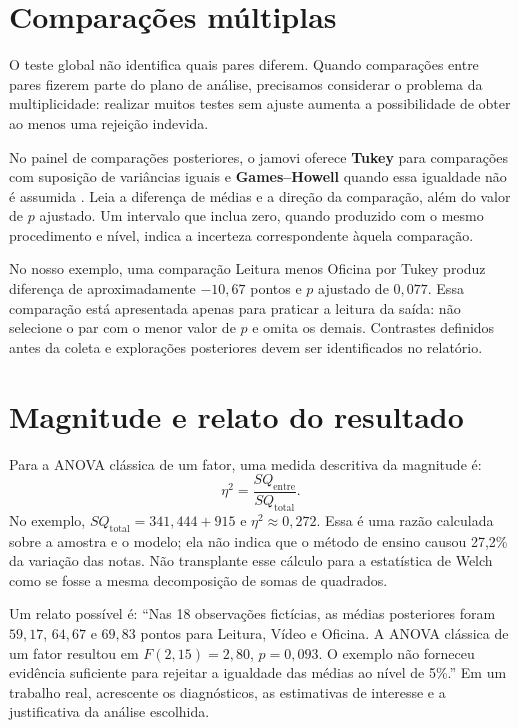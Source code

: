 \section{Comparações múltiplas}

O teste global não identifica quais pares diferem. Quando comparações entre pares fizerem parte do plano de análise, precisamos considerar o problema da multiplicidade: realizar muitos testes sem ajuste aumenta a possibilidade de obter ao menos uma rejeição indevida.

No painel de comparações posteriores, o jamovi oferece \textbf{Tukey} para comparações com suposição de variâncias iguais e \textbf{Games--Howell} quando essa igualdade não é assumida \parencite{JamoviAnova}. Leia a diferença de médias e a direção da comparação, além do valor de $p$ ajustado. Um intervalo que inclua zero, quando produzido com o mesmo procedimento e nível, indica a incerteza correspondente àquela comparação.

No nosso exemplo, uma comparação Leitura menos Oficina por Tukey produz diferença de aproximadamente $-10{,}67$ pontos e $p$ ajustado de $0{,}077$. Essa comparação está apresentada apenas para praticar a leitura da saída: não selecione o par com o menor valor de $p$ e omita os demais. Contrastes definidos antes da coleta e explorações posteriores devem ser identificados no relatório.

\section{Magnitude e relato do resultado}

Para a ANOVA clássica de um fator, uma medida descritiva da magnitude é:
\[
\eta^2=\frac{SQ_{\mathrm{entre}}}{SQ_{\mathrm{total}}}.
\]
No exemplo, $SQ_{\mathrm{total}}=341{,}444+915$ e $\eta^2\approx0{,}272$. Essa é uma razão calculada sobre a amostra e o modelo; ela não indica que o método de ensino causou 27,2\% da variação das notas. Não transplante esse cálculo para a estatística de Welch como se fosse a mesma decomposição de somas de quadrados.

Um relato possível é: ``Nas 18 observações fictícias, as médias posteriores foram $59{,}17$, $64{,}67$ e $69{,}83$ pontos para Leitura, Vídeo e Oficina. A ANOVA clássica de um fator resultou em $F(2,15)=2{,}80$, $p=0{,}093$. O exemplo não forneceu evidência suficiente para rejeitar a igualdade das médias ao nível de 5\%.'' Em um trabalho real, acrescente os diagnósticos, as estimativas de interesse e a justificativa da análise escolhida.

